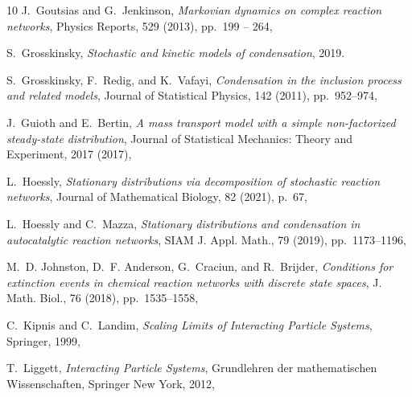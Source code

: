 \documentclass{amsart}
\theoremstyle{definition}
\theoremstyle{remark}
\theoremstyle{Conjecture/open problem}
\theoremstyle{assumption}
\theoremstyle{conjecture}
\numberwithin{equation}{section}
\begin{document}
\begin{thebibliography}{10}
{\sc J.~Goutsias and G.~Jenkinson}, {\em Markovian dynamics on complex reaction
  networks}, Physics Reports, 529 (2013), pp.~199 -- 264,

{\sc S.~Grosskinsky}, {\em Stochastic and kinetic models of condensation},
  2019.

{\sc S.~Grosskinsky, F.~Redig, and K.~Vafayi}, {\em Condensation in the
  inclusion process and related models}, Journal of Statistical Physics, 142
  (2011), pp.~952--974, %

{\sc J.~Guioth and E.~Bertin}, {\em A mass transport model with a simple
  non-factorized steady-state distribution}, Journal of Statistical Mechanics:
  Theory and Experiment, 2017 (2017),

{\sc L.~Hoessly}, {\em Stationary distributions via decomposition of stochastic
  reaction networks}, Journal of Mathematical Biology, 82 (2021), p.~67,

{\sc L.~Hoessly and C.~Mazza}, {\em Stationary distributions and condensation
  in autocatalytic reaction networks}, SIAM J. Appl. Math., 79 (2019),
  pp.~1173--1196, %

{\sc M.~D. Johnston, D.~F. Anderson, G.~Craciun, and R.~Brijder}, {\em
  Conditions for extinction events in chemical reaction networks with discrete
  state spaces}, J. Math. Biol., 76 (2018), pp.~1535--1558,

{\sc C.~Kipnis and C.~Landim}, {\em {Scaling Limits of Interacting Particle
  Systems}}, Springer, 1999,

{\sc T.~Liggett}, {\em Interacting Particle Systems}, Grundlehren der
  mathematischen Wissenschaften, Springer New York, 2012,


\end{thebibliography}
\end{document}
